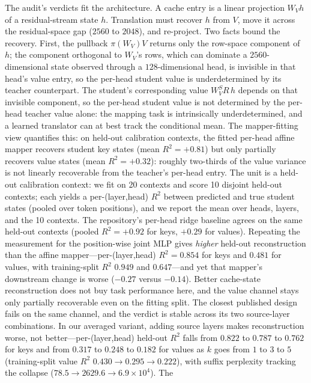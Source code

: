 \documentclass{article} %
\begin{document}
The audit's verdicts fit the architecture. A cache entry is a linear
projection $W_V h$ of a residual-stream state $h$. Translation must recover
$h$ from $V$, move it across the residual-space gap ($2560$ to $2048$), and
re-project. Two facts bound the recovery. First, the pullback
$\pi(W_V)V$ returns only the row-space component of $h$; the component
orthogonal to $W_V$'s rows, which can dominate a $2560$-dimensional state
observed through a $128$-dimensional head, is invisible in that head's value
entry, so the per-head student value is underdetermined by its teacher
counterpart. The
student's corresponding value $W_V^S R\, h$ depends on that invisible
component, so the per-head student value is not determined by the per-head teacher value alone: the mapping task is
intrinsically underdetermined, and a learned translator can at best track the
conditional mean. The mapper-fitting view quantifies this: on held-out
calibration contexts, the fitted per-head affine mapper recovers student key
states (mean $R^2 = +0.81$) but only partially recovers value states (mean
$R^2 = +0.32$): roughly two-thirds of the value variance is not linearly
recoverable from the teacher's per-head entry. The unit is a held-out
calibration context: we fit on 20 contexts and score 10 disjoint held-out
contexts; each yields a per-(layer,head) $R^2$ between predicted and true
student states (pooled over token positions), and we report the mean over
heads, layers, and the 10 contexts. The repository's per-head ridge baseline
agrees on the same held-out contexts (pooled $R^2 = +0.92$ for keys, $+0.29$
for values). Repeating the measurement for the position-wise joint MLP gives
\emph{higher} held-out reconstruction than the affine mapper---per-(layer,head)
$R^2 = 0.854$ for keys and $0.481$ for values, with training-split $R^2$ $0.949$
and $0.647$---and yet that mapper's downstream change is worse ($-0.27$ versus
$-0.14$). Better cache-state reconstruction does not buy task performance here,
and the value channel stays only partially recoverable even on the fitting
split. The closest published design fails on the same channel, and the verdict
is stable across its two source-layer combinations. In our averaged variant,
adding source layers makes reconstruction worse, not better---per-(layer,head)
held-out $R^2$ falls from $0.822$ to $0.787$ to $0.762$ for keys and from
$0.317$ to $0.248$ to $0.182$ for values as $k$ goes from $1$ to $3$ to $5$
(training-split value $R^2$ $0.430 \to 0.295 \to 0.222$), with suffix
perplexity tracking the collapse ($78.5 \to 2629.6 \to 6.9\times10^{4}$). The
\end{document}

